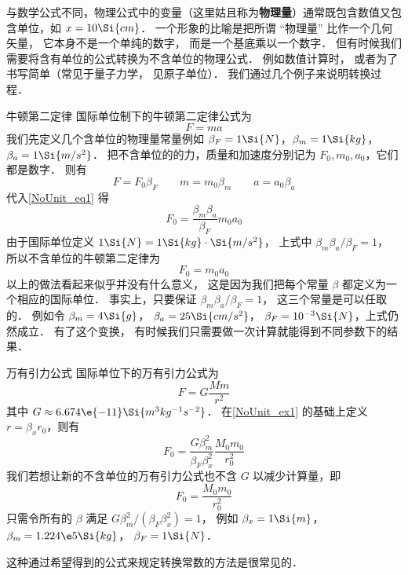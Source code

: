 

与数学公式不同，物理公式中的变量（这里姑且称为\textbf{物理量}）通常既包含数值又包含单位，如 $x = 10\Si{cm}$． 一个形象的比喻是把所谓 “物理量” 比作一个几何矢量， 它本身不是一个单纯的数字， 而是一个基底乘以一个数字． 但有时候我们需要将含有单位的公式转换为不含单位的物理公式． 例如数值计算时， 或者为了书写简单（常见于量子力学， 见原子单位）． 我们通过几个例子来说明转换过程．

\begin{example}{牛顿第二定律}\label{NoUnit_ex1}
国际单位制下的牛顿第二定律公式为
\begin{equation}\label{NoUnit_eq1}
F = ma
\end{equation}
我们先定义几个含单位的物理量常量例如 $\beta_{F} = 1\Si{N}$，$\beta_{m} = 1\Si{kg}$，$\beta_{a} = 1\Si{m/s^2}$． 把不含单位的的力，质量和加速度分别记为 $F_0, m_0, a_0$，它们都是数字． 则有
\begin{equation}
F = F_0 \beta_F \qquad
m = m_0 \beta_{m} \qquad
a = a_0 \beta_{a}
\end{equation}
代入\autoref{NoUnit_eq1} 得
\begin{equation}
F_0 = \frac{\beta_m \beta_a}{\beta_F} m_0  a_0
\end{equation}
由于国际单位定义 $1\Si{N} = 1\Si{kg}\cdot\Si{m/s^2}$， 上式中 $\beta_m \beta_a/\beta_F = 1$， 所以不含单位的牛顿第二定律为
\begin{equation}\label{NoUnit_eq3}
F_0 = m_0 a_0
\end{equation}
以上的做法看起来似乎并没有什么意义， 这是因为我们把每个常量 $\beta$ 都定义为一个相应的国际单位． 事实上，只要保证 $\beta_m \beta_a/\beta_F = 1$， 这三个常量是可以任取的． 例如令 $\beta_m = 4\Si{g}$， $\beta_a = 25\Si{cm/s^2}$， $\beta_F = 10^{-3}\Si{N}$，上式仍然成立． 有了这个变换， 有时候我们只需要做一次计算就能得到不同参数下的结果．
\end{example}

\begin{example}{万有引力公式}\label{NoUnit_ex2}
国际单位下的万有引力公式为
\begin{equation}
F = G\frac{Mm}{r^2}
\end{equation}
其中 $G \approx 6.674\e{-11} \Si{m^3 kg^{-1} s^{-2}}$． 在\autoref{NoUnit_ex1} 的基础上定义 $r = \beta_x r_0$，则有
\begin{equation}
F_0 = \frac{G\beta_m^2}{\beta_F \beta_x^2} \frac{M_0 m_0}{r_0^2}
\end{equation}
我们若想让新的不含单位的万有引力公式也不含 $G$ 以减少计算量，即
\begin{equation}\label{NoUnit_eq6}
F_0 = \frac{M_0 m_0}{r_0^2}
\end{equation}
只需令所有的 $\beta$ 满足 $G\beta_m^2/(\beta_F\beta_x^2) = 1$， 例如 $\beta_x = 1\Si{m}$， $\beta_m = 1.224\e5 \Si{kg}$， $\beta_F = 1\Si{N}$．
\end{example}
这种通过希望得到的公式来规定转换常数的方法是很常见的．

